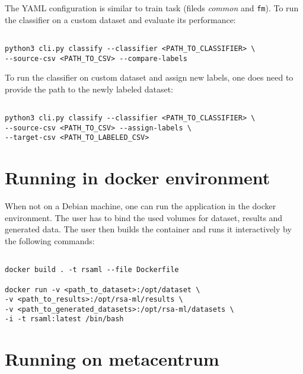 \noindent
The YAML configuration is similar to train task (fileds \textit{common} and \texttt{fm}). To run the classifier on a custom dataset and evaluate its performance:

\begin{verbatim}

python3 cli.py classify --classifier <PATH_TO_CLASSIFIER> \
--source-csv <PATH_TO_CSV> --compare-labels

\end{verbatim}

\noindent
To run the classifier on custom dataset and assign new labels, one does need to provide the path to the newly labeled dataset:

\begin{verbatim}

python3 cli.py classify --classifier <PATH_TO_CLASSIFIER> \
--source-csv <PATH_TO_CSV> --assign-labels \
--target-csv <PATH_TO_LABELED_CSV>

\end{verbatim}

\section{Running in docker environment}
\label{appendix-docker}

When not on a Debian machine, one can run the application in the docker environment. The user has to bind the used volumes for dataset, results and generated data. The user then builds the container and runs it interactively by the following commands:

\begin{verbatim}

docker build . -t rsaml --file Dockerfile

docker run -v <path_to_dataset>:/opt/dataset \
-v <path_to_results>:/opt/rsa-ml/results \
-v <path_to_generated_datasets>:/opt/rsa-ml/datasets \
-i -t rsaml:latest /bin/bash

\end{verbatim}

\section{Running on metacentrum}
\label{appendix-metacentrum}

